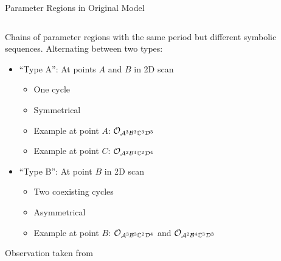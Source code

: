 \begin{frame}{Parameter Regions in Original Model}
    \begin{columns}
        \begin{column}{0.7 \textwidth}
            Chains of parameter regions with the same period but different symbolic sequences.
            Alternating between two types:

            \begin{itemize}
                \item ``Type A'': At points $A$ and $B$ in 2D scan
                      \begin{itemize}
                          \item One cycle
                          \item Symmetrical
                          \item Example at point $A$: $\mathcal{O}_{\mathcal{A}^3\mathcal{B}^3\mathbb{C}^3\mathcal{D}^3}$
                          \item Example at point $C$: $\mathcal{O}_{\mathcal{A}^2\mathcal{B}^4\mathbb{C}^2\mathcal{D}^4}$ \vspace*{1em}
                      \end{itemize}
                \item ``Type B'': At point $B$ in 2D scan
                      \begin{itemize}
                          \item Two coexisting cycles
                          \item Asymmetrical
                          \item Example at point $B$: $\mathcal{O}_{\mathcal{A}^3\mathcal{B}^3\mathbb{C}^2\mathcal{D}^4}$ and $\mathcal{O}_{\mathcal{A}^2\mathcal{B}^4\mathbb{C}^3\mathcal{D}^3}$
                      \end{itemize}
            \end{itemize}

            \begin{flushright}
                Observation taken from \cite{akyuz2022}
            \end{flushright}
        \end{column}
        \begin{column}{0.3 \textwidth}
            \begin{center}
                \vspace{-2em}
\end{center}
\end{column}
\end{columns}
\end{frame}
